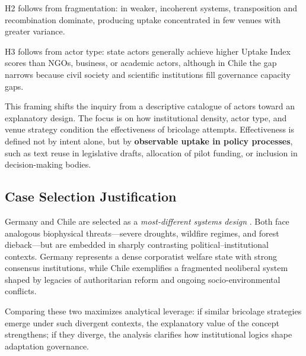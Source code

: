H2 follows from fragmentation: in weaker, incoherent systems, transposition and 
recombination dominate, producing uptake concentrated in few venues with greater 
variance.  

H3 follows from actor type: state actors generally achieve higher Uptake Index
scores than NGOs, business, or academic actors, although in Chile the gap
narrows because civil society and scientific institutions fill governance
capacity gaps.  

This framing shifts the inquiry from a descriptive catalogue of actors toward an 
explanatory design. The focus is on how institutional density, actor type, and
venue strategy condition the effectiveness of bricolage attempts. Effectiveness
is defined not by intent alone, but by \textbf{observable uptake in policy
processes}, such as text reuse in legislative drafts, allocation of pilot
funding, or inclusion in decision-making bodies.

\subsection*{Case Selection Justification}
Germany and Chile are selected as a \emph{most-different systems design} 
\parencite{George2005}. 
Both face analogous biophysical threats---severe droughts, wildfire 
regimes, and forest dieback---but are embedded in sharply contrasting 
political–institutional contexts. 
Germany represents a dense corporatist welfare state with strong 
consensus institutions, while Chile exemplifies a fragmented neoliberal 
system shaped by legacies of authoritarian reform and ongoing 
socio-environmental conflicts. 

Comparing these two maximizes analytical leverage: if similar bricolage 
strategies emerge under such divergent contexts, the explanatory value 
of the concept strengthens; if they diverge, the analysis clarifies how 
institutional logics shape adaptation governance.

